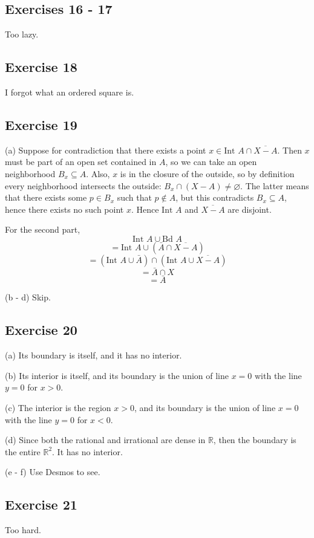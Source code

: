 \documentclass{book}
\begin{document}
\subsection*{Exercises 16 - 17}
Too lazy.

\subsection*{Exercise 18}
I forgot what an ordered square is.

\subsection*{Exercise 19}
(a)
Suppose for contradiction that there exists a point $x \in \text{Int } A \cap \overline{X - A}$. Then $x$ must be part of an open set contained in $A$, so we can take an open neighborhood $B_x \subseteq A$. Also, $x$ is in the closure of the outside, so by definition every neighborhood intersects the outside: $B_x \cap (X - A) \neq \varnothing$. The latter means that there exists some $p \in B_x$ such that $p \not \in A$, but this contradicts $B_x \subseteq A$, hence there exists no such point $x$. Hence $\text{Int } A$ and $\overline{X - A}$ are disjoint.

For the second part,
$$\text{Int } A \cup \text{Bd } A$$
$$= \text{Int } A \cup (\bar{A} \cap \overline{X - A})$$
$$= (\text{Int } A \cup \bar{A}) \cap (\text{Int } A \cup \overline{X - A})$$
$$= \bar{A} \cap X$$
$$= \bar{A}$$

\noindent
(b - d)
Skip.

\subsection*{Exercise 20}
(a)
Its boundary is itself, and it has no interior.

\noindent
(b)
Its interior is itself, and its boundary is the union of line $x = 0$ with the line $y = 0$ for $x > 0$.

\noindent
(c)
The interior is the region $x > 0$, and its boundary is the union of line $x = 0$ with the line $y = 0$ for $x < 0$.

\noindent
(d)
Since both the rational and irrational are dense in $\mathbb{R}$, then the boundary is the entire $\mathbb{R}^2$. It has no interior.

\noindent
(e - f)
Use Desmos to see.

\subsection*{Exercise 21}
Too hard.
\end{document}

